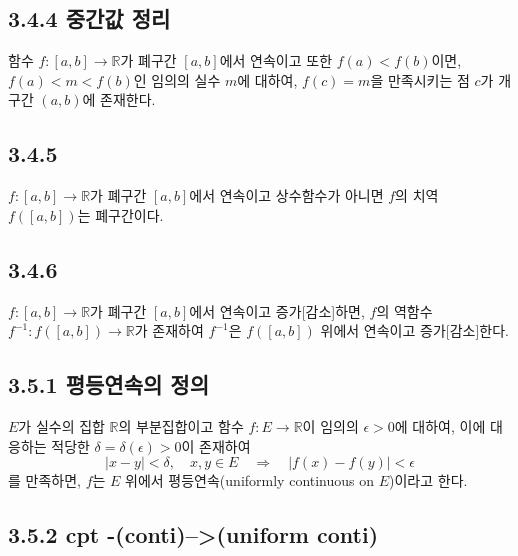 \documentclass{article}
\begin{document}
\subsection*{\textmd{3.4.4 중간값 정리}}

함수 $f: [a, b] \to \mathbb{R}$가 폐구간 $[a, b]$에서 연속이고 또한 $f(a) < f(b)$이면, $f(a) < m < f(b)$인 임의의 실수 $m$에 대하여, $f(c) = m$을 만족시키는 점 $c$가 개구간 $(a, b)$에 존재한다.

\subsection*{\textmd{3.4.5}}

$f: [a, b] \to \mathbb{R}$가 폐구간 $[a, b]$에서 연속이고 상수함수가 아니면 $f$의 치역 $f([a, b])$는 폐구간이다.

\subsection*{\textmd{3.4.6}}

$f: [a, b] \to \mathbb{R}$가 폐구간 $[a, b]$에서 연속이고 증가[감소]하면, $f$의 역함수 $f^{-1}: f([a, b]) \to \mathbb{R}$가 존재하여 $f^{-1}$은 $f([a, b])$ 위에서 연속이고 증가[감소]한다.



\subsection{\fontsize{11.5}{13}\selectfont{
함수의 평등연속성을 정의, 연속성과의 차이점 및 관계, 평등연속함수의 성질들을 다룬다.}}


\subsection*{\textmd{3.5.1 평등연속의 정의}}

$E$가 실수의 집합 $\mathbb{R}$의 부분집합이고 함수 $f: E \to \mathbb{R}$이 
임의의 $\epsilon > 0$에 대하여, 이에 대응하는 적당한 $\delta = \delta(\epsilon) > 0$이 존재하여
\[
\left| x - y \right| < \delta, \quad x, y \in E \quad \Rightarrow \quad \left| f(x) - f(y) \right| < \epsilon
\]
를 만족하면, $f$는 $E$ 위에서 평등연속(uniformly continuous on $E$)이라고 한다.

\subsection*{\textmd{3.5.2 cpt -(conti)--\textgreater (uniform conti)}}
\end{document}
